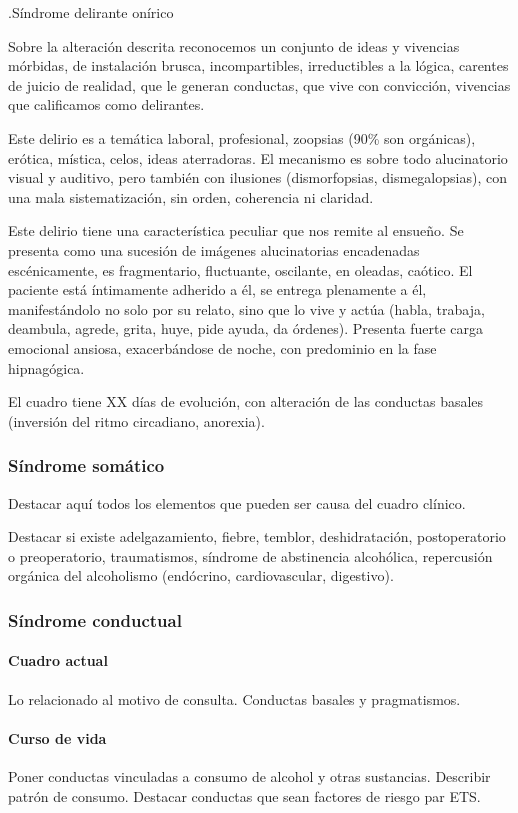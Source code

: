 .Síndrome delirante onírico

Sobre la alteración descrita reconocemos un conjunto de ideas y vivencias mórbidas, de instalación brusca, incompartibles, irreductibles a la lógica, carentes de juicio de realidad, que le generan conductas, que vive con convicción, vivencias que calificamos como delirantes.

Este delirio es a temática laboral, profesional, zoopsias (90\% son orgánicas), erótica, mística, celos, ideas aterradoras. El mecanismo es sobre todo alucinatorio visual y auditivo, pero también con ilusiones (dismorfopsias, dismegalopsias), con una mala sistematización, sin orden, coherencia ni claridad.

Este delirio tiene una característica peculiar que nos remite al ensueño. Se presenta como una sucesión de imágenes alucinatorias encadenadas escénicamente, es fragmentario, fluctuante, oscilante, en oleadas, caótico. El paciente está íntimamente adherido a él, se entrega plenamente a él, manifestándolo no solo por su relato, sino que lo vive y actúa (habla, trabaja, deambula, agrede, grita, huye, pide ayuda, da órdenes). Presenta fuerte carga emocional ansiosa, exacerbándose de noche, con predominio en la fase hipnagógica.

El cuadro tiene XX días de evolución, con alteración de las conductas basales (inversión del ritmo circadiano, anorexia).

\subsubsection*{Síndrome somático}

Destacar aquí todos los elementos que pueden ser causa del cuadro clínico.

Destacar si existe adelgazamiento, fiebre, temblor, deshidratación, postoperatorio o preoperatorio, traumatismos, síndrome de abstinencia alcohólica, repercusión orgánica del alcoholismo (endócrino, cardiovascular, digestivo).
\subsubsection*{Síndrome conductual}
\paragraph{Cuadro actual}
Lo relacionado al motivo de consulta. Conductas basales y pragmatismos.
\paragraph{Curso de vida}
Poner conductas vinculadas a consumo de alcohol y otras sustancias. Describir patrón de consumo. Destacar conductas que sean factores de riesgo par ETS.
